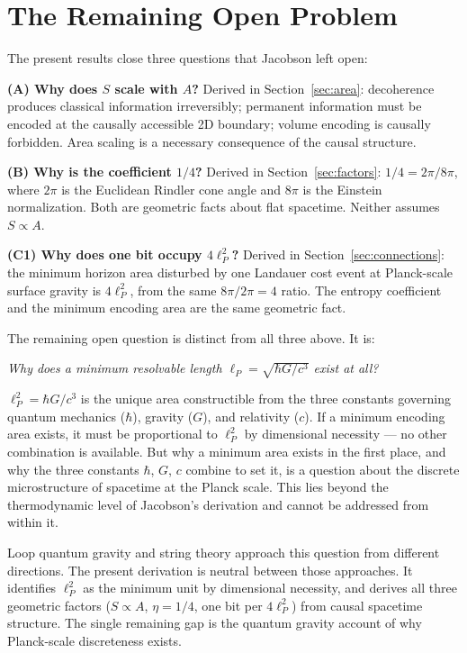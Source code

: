 \documentclass[12pt,a4paper]{article}
\begin{document}
\section{The Remaining Open Problem}
\label{sec:open}

The present results close three questions that Jacobson left open:

\textbf{(A) Why does $S$ scale with $A$?} Derived in
Section~\ref{sec:area}: decoherence produces classical information
irreversibly; permanent information must be encoded at the causally
accessible 2D boundary; volume encoding is causally forbidden.
Area scaling is a necessary consequence of the causal structure.

\textbf{(B) Why is the coefficient $1/4$?} Derived in
Section~\ref{sec:factors}: $1/4 = 2\pi/8\pi$, where $2\pi$ is the
Euclidean Rindler cone angle and $8\pi$ is the Einstein normalization.
Both are geometric facts about flat spacetime. Neither assumes $S
\propto A$.

\textbf{(C1) Why does one bit occupy $4\ell_P^2$?} Derived in
Section~\ref{sec:connections}: the minimum horizon area disturbed
by one Landauer cost event at Planck-scale surface gravity is
$4\ell_P^2$, from the same $8\pi/2\pi = 4$ ratio. The entropy
coefficient and the minimum encoding area are the same geometric
fact.

The remaining open question is distinct from all three above. It is:

\begin{center}
\textit{Why does a minimum resolvable length $\ell_P = \sqrt{\hbar G/c^3}$
exist at all?}
\end{center}

$\ell_P^2 = \hbar G/c^3$ is the unique area constructible from the
three constants governing quantum mechanics ($\hbar$), gravity ($G$),
and relativity ($c$). If a minimum encoding area exists, it must be
proportional to $\ell_P^2$ by dimensional necessity --- no other
combination is available. But why a minimum area exists in the first
place, and why the three constants $\hbar$, $G$, $c$ combine to set
it, is a question about the discrete microstructure of spacetime at
the Planck scale. This lies beyond the thermodynamic level of
Jacobson's derivation and cannot be addressed from within it.

Loop quantum gravity and string theory approach this question from
different directions. The present derivation is neutral between those
approaches. It identifies $\ell_P^2$ as the minimum unit by dimensional
necessity, and derives all three geometric factors ($S \propto A$,
$\eta = 1/4$, one bit per $4\ell_P^2$) from causal spacetime
structure. The single remaining gap is the quantum gravity account of
why Planck-scale discreteness exists.
\end{document}
